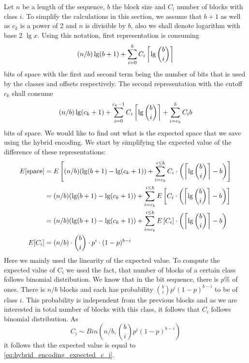 Let $n$ be a length of the
sequence, $b$ the block size and $C_i$ number of blocks with class $i$. To simplify the
calculations in this section, we assume that $b+1$ as well as $c_k$ is a power of 2 and
$n$ is divisible by $b$, also we shall denote logarithm with base 2 $\lg x$. Using this
notation, first representation is consuming
$$(n/b)\lg (b+1) + \sum_{i=0}^{b} C_i\left\lceil \lg {b\choose i} \right\rceil$$ bits of space with the
first and second term being the number of bits that is used by the classes and offsets
respectively. The second representation with the cutoff $c_k$ shall consume
$$(n/b)\lg (c_k+1) + \sum_{i=0}^{c_k-1}C_i\left\lceil \lg {b\choose i} \right\rceil + \sum_{i=c_k}^{b}C_i b$$
bits of space. We would like to find out what is the expected space that we save using the
hybrid encoding. We start by simplifying the expected value of the difference of these
representations:
\begin{align}
E[\text{space}] &= E\left[(n/b)(\lg(b+1)-\lg(c_k+1)) + \sum_{i=c_k}^{i\leq b}C_i\cdot \left(\left\lceil \lg{b\choose i} \right\rceil - b\right)\right] \nonumber\\
&=(n/b)(\lg(b+1)-\lg(c_k+1)) + \sum_{i=c_k}^{i\leq b}E\left[C_i\cdot \left(\left\lceil \lg{b\choose i} \right\rceil - b\right)\right] \nonumber\\
&=(n/b)(\lg(b+1)-\lg(c_k+1)) + \sum_{i=c_k}^{i\leq b}E\left[C_i\right]\cdot \left(\left\lceil \lg{b\choose i} \right\rceil - b\right) \nonumber\\
E[C_i] &= (n/b)\cdot {b\choose i}\cdot p^i\cdot (1-p)^{b-i} \label{eq:hybrid_encoding_expected_c_i}
\end{align}
Here we mainly used the linearity of the expected value. To compute the expected value of
$C_i$ we used the fact, that number of blocks of a certain class follows binomial
distribution. We know that in the bit sequence, there is $p\%$ of ones. There is $n/b$ blocks
and each has probability ${b\choose i}p^i(1-p)^{b-i}$ to be of class $i$. This probability
is independent from the previous blocks and as we are interested in total number of blocks with
this class, it follows that $C_i$ follows binomial distribution. As
$$C_i \sim Bin\left(n/b, {b\choose i}p^i(1-p)^{b-i}\right)$$ it follows that the expected value
is equal to \ref{eq:hybrid_encoding_expected_c_i}.

